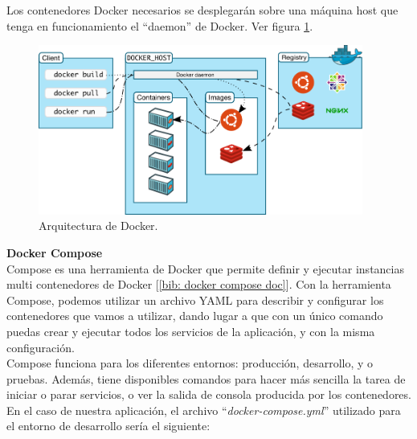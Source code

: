 \documentclass[a4paper, oneside, 12pt]{book}
\begin{document}
	\noindent Los contenedores Docker necesarios se desplegarán sobre una máquina host que tenga en funcionamiento el ``daemon'' de Docker. Ver figura \ref{img: docker arch}.
	
	\begin{figure}[h!]
		\begin{center}
			\includegraphics[width=0.95\textwidth]{img/architecture-docker.png}
			\caption{Arquitectura de Docker.}
			\label{img: docker arch}
		\end{center}
	\end{figure}

	\pagebreak
	
	\noindent \textbf{\large Docker Compose} \\
	
	\noindent Compose es una herramienta de Docker que permite definir y ejecutar instancias multi contenedores de Docker [\ref{bib: docker compose doc}]. Con la herramienta Compose, podemos utilizar un archivo YAML para describir y configurar los contenedores que vamos a utilizar, dando lugar a que con un único comando puedas crear y ejecutar todos los servicios de la aplicación, y con la misma configuración. \\
	
	\noindent Compose funciona para los diferentes entornos: producción, desarrollo, y o pruebas. Además, tiene disponibles comandos para hacer más sencilla la tarea de iniciar o parar servicios, o ver la salida de consola producida por los contenedores. \\
	
	\noindent En el caso de nuestra aplicación, el archivo ``\textit{docker-compose.yml}'' utilizado para el entorno de desarrollo sería el siguiente:
	
\end{document}
